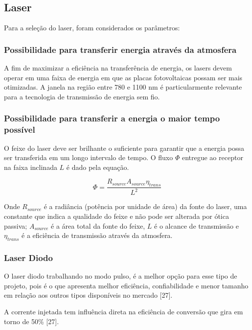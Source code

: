 \subsection{Laser}

Para a seleção do laser, foram considerados os parâmetros:

\subsubsection{Possibilidade para transferir energia através da atmosfera}

A fim de maximizar a eficiência na transferência de energia, os lasers devem operar em uma faixa de energia em que as placas fotovoltaicas possam ser mais otimizadas. A janela na região entre 780 e 1100 nm é particularmente relevante para a tecnologia de transmissão de energia sem fio.

\subsubsection{Possibilidade para transferir a energia o maior tempo possível}

O feixe do laser deve ser brilhante o suficiente para garantir que a energia possa ser transferida em um longo intervalo de tempo. O fluxo $\Phi$ entregue ao receptor na faixa inclinada $L$ é dado pela equação.

\begin{equation}
\label{eq:gaussiano}
\Phi = \frac{R_{source} A_{source} \eta_{trans}}{L^2}
\end{equation}

Onde $R_{source}$ é a radiância (potência por unidade de área) da fonte do laser, uma constante que indica a qualidade do feixe e não pode ser alterada por ótica passiva; $A_{source}$ é a área total da fonte do feixe, $L$ é o alcance de transmissão e  $\eta_{trans}$ é a eficiência de transmissão através da atmosfera.

\subsubsection{Laser Diodo}

O laser diodo trabalhando no modo pulso, é a melhor opção para esse tipo de projeto, pois é o que apresenta melhor eficiência, confiabilidade e menor tamanho em relação aos outros tipos disponíveis no mercado [27].

A corrente injetada tem influência direta na eficiência de conversão que gira em torno de 50\% [27].

